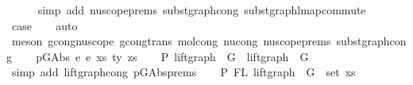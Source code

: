 \begin{isabellebody}
\ \ \ \ \isamarkupfalse%
\ {\isacharparenleft}{\kern0pt}simp\ add{\isacharcolon}{\kern0pt}\ nu{\isacharunderscore}{\kern0pt}scope{\isachardot}{\kern0pt}prems{\isacharparenleft}{\kern0pt}{}{\isacharcomma}{\kern0pt}{}{\isacharcomma}{\kern0pt}{}{\isacharparenright}{\kern0pt}\ subst{\isacharunderscore}{\kern0pt}graph{\isacharunderscore}{\kern0pt}cong{}\ subst{\isacharunderscore}{\kern0pt}graph{\isacharunderscore}{\kern0pt}lmap{\isacharunderscore}{\kern0pt}commute{\isacharparenright}{\kern0pt}\isanewline
\ \ \isamarkupfalse%
\ \isamarkupfalse%
\ {\isacharquery}{\kern0pt}case\isanewline
\ \ \isamarkupfalse%
\ auto\isanewline
\ \ \ \ \ \isamarkupfalse%
\ {\isacharparenleft}{\kern0pt}meson\ gcong{\isachardot}{\kern0pt}nu{\isacharunderscore}{\kern0pt}scope\ gcong{\isachardot}{\kern0pt}trans\ mol{\isacharunderscore}{\kern0pt}cong\ nu{\isacharunderscore}{\kern0pt}cong\ nu{\isacharunderscore}{\kern0pt}scope{\isachardot}{\kern0pt}prems{\isacharparenleft}{\kern0pt}{}{\isacharcomma}{\kern0pt}{}{\isacharcomma}{\kern0pt}{}{\isacharparenright}{\kern0pt}\ subst{\isacharunderscore}{\kern0pt}graph{\isacharunderscore}{\kern0pt}cong{}{\isacharparenright}{\kern0pt}\isanewline
{}\isamarkupfalse%
\isanewline
\ \ \isamarkupfalse%
\ {\isacharparenleft}{\kern0pt}p{\isacharunderscore}{\kern0pt}GAbs\ e{}\ e{}\ xs\ ty\ zs{\isacharparenright}{\kern0pt}\isanewline
\ \ \isamarkupfalse%
\ P{}{\isacharcolon}{\kern0pt}\ {\isachardoublequoteopen}lift{\isacharunderscore}{\kern0pt}graph\ {}\ G{}\ {\isasymsimeq}\ lift{\isacharunderscore}{\kern0pt}graph\ {}\ G{}{\isachardoublequoteclose}\isanewline
\ \ \ \ \isamarkupfalse%
\ {\isacharparenleft}{\kern0pt}simp\ add{\isacharcolon}{\kern0pt}\ lift{\isacharunderscore}{\kern0pt}graph{\isacharunderscore}{\kern0pt}cong\ p{\isacharunderscore}{\kern0pt}GAbs{\isachardot}{\kern0pt}prems{\isacharparenleft}{\kern0pt}{}{\isacharparenright}{\kern0pt}{\isacharparenright}{\kern0pt}\isanewline
\ \ \isamarkupfalse%
\ P{}{\isacharcolon}{\kern0pt}\ {\isachardoublequoteopen}FL\ {\isacharparenleft}{\kern0pt}lift{\isacharunderscore}{\kern0pt}graph\ {}\ G{}{\isacharparenright}{\kern0pt}\ {\isacharequal}{\kern0pt}\ set\ xs{\isachardoublequoteclose}\isanewline

\end{isabellebody}
